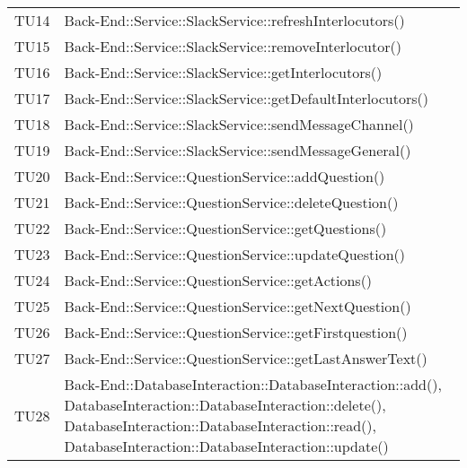 \documentclass[../PianoDiQualifica.tex]{subfiles}
\begin{document}
\begin{longtable}[c] { >{\centering\arraybackslash}p{3cm} >{\centering\arraybackslash}p{9.5cm}}
			\addlinespace[0.3em]
			\midrule
			\addlinespace[0.3em]
			TU14 & Back-End::Service::SlackService::refreshInterlocutors() \\
			\addlinespace[0.3em]
			\midrule
			\addlinespace[0.3em]
			TU15 & Back-End::Service::SlackService::removeInterlocutor() \\
			\addlinespace[0.3em]
			\midrule
			\addlinespace[0.3em]
			TU16 & Back-End::Service::SlackService::getInterlocutors() \\
			\addlinespace[0.3em]
			\midrule
			\addlinespace[0.3em]
			TU17 & Back-End::Service::SlackService::getDefaultInterlocutors() \\ 
			\addlinespace[0.3em]
			\midrule
			\addlinespace[0.3em]
			TU18 & Back-End::Service::SlackService::sendMessageChannel() \\ 
			\addlinespace[0.3em]
			\midrule
			\addlinespace[0.3em]
			TU19 & Back-End::Service::SlackService::sendMessageGeneral() \\ 
			\addlinespace[0.3em]
			\midrule
			\addlinespace[0.3em] 
			TU20 & Back-End::Service::QuestionService::addQuestion() \\ 
			\addlinespace[0.3em]
			\midrule
			\addlinespace[0.3em]
			TU21 & Back-End::Service::QuestionService::deleteQuestion() \\ 
			\addlinespace[0.3em]
			\midrule
			\addlinespace[0.3em]
			TU22 & Back-End::Service::QuestionService::getQuestions() \\
			\addlinespace[0.3em]
			\midrule
			\addlinespace[0.3em] 
			TU23 & Back-End::Service::QuestionService::updateQuestion() \\ 
			\addlinespace[0.3em]
			\midrule
			\addlinespace[0.3em]
			TU24 & Back-End::Service::QuestionService::getActions() \\ 
			\addlinespace[0.3em]
			\midrule
			\addlinespace[0.3em]
			TU25 & Back-End::Service::QuestionService::getNextQuestion() \\ 
			\addlinespace[0.3em]
			\midrule
			\addlinespace[0.3em]
			TU26 & Back-End::Service::QuestionService::getFirstquestion() \\
			\addlinespace[0.3em]
			\midrule
			\addlinespace[0.3em] 
			TU27 & Back-End::Service::QuestionService::getLastAnswerText() \\ 
			\addlinespace[0.3em]
			\midrule
			\addlinespace[0.3em]
			TU28 & Back-End::DatabaseInteraction::DatabaseInteraction::add(), DatabaseInteraction::DatabaseInteraction::delete(), DatabaseInteraction::DatabaseInteraction::read(), DatabaseInteraction::DatabaseInteraction::update() \\

\end{longtable}
\end{document}
